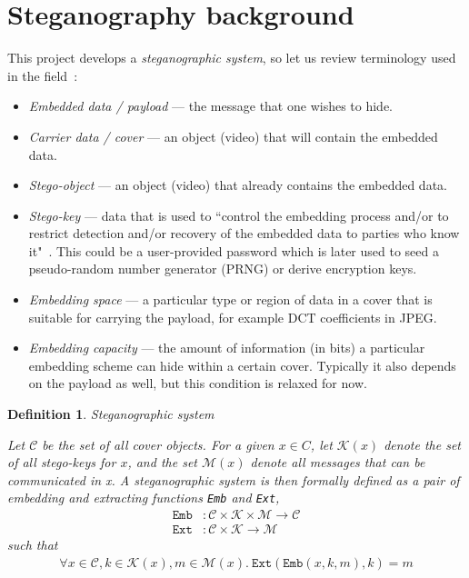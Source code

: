 \documentclass[12pt,british,twoside,notitlepage,usenames,dvipsnames,hypens,final]{report}
\newtheorem{definition}{Definition}
\numberwithin{equation}{section}
\numberwithin{figure}{section}
\begin{document}
\section{Steganography background}

This project develops a \emph{steganographic system}, so let us review terminology used in the field~\cite{infohiding-survey, bateman}:
\begin{itemize}
\item \emph{Embedded data / payload} --- the message that one wishes to hide.
\item \emph{Carrier data / cover} --- an object (video) that will contain the embedded data.
\item \emph{Stego-object } --- an object (video) that already contains the embedded data.
\item \emph{Stego-key} ---  data that is used to ``control the embedding process and/or to restrict detection and/or recovery of the embedded data to parties who know it"~\cite{infohiding-survey}. This could be a user-provided password which is later used to seed a pseudo-random number generator (PRNG) or derive encryption keys. 
\item \emph{Embedding space} --- a particular type or region of data in a cover that is suitable for carrying the payload, for example DCT coefficients in JPEG.
\item \emph{Embedding capacity} --- the amount of information (in bits) a particular embedding scheme can hide within a certain cover. Typically it also depends on the payload as well, but this condition is relaxed for now.
\end{itemize}

\begin{definition}{Steganographic system~\cite[p.~53]{fridrich}}

Let $\mathcal{C}$ be the set of all cover objects. For a given $x \in C$, let $\mathcal{K}(x)$ denote the set of all stego-keys for $x$, and the set $\mathcal{M}(x)$ denote all messages that can be communicated in x. A steganographic system is then formally defined as a pair of embedding and extracting functions \texttt{Emb} and \texttt{Ext},
\begin{align*}
\texttt{Emb} &: \mathcal{C} \times \mathcal{K} \times \mathcal{M} \rightarrow \mathcal{C} \\
\texttt{Ext} &: \mathcal{C} \times \mathcal{K} \rightarrow \mathcal{M}
\end{align*}
\vspace{-1mm}
such that
\vspace{-1mm}
\begin{align*}
\forall x \in \mathcal{C}, k \in \mathcal{K}(x), m \in \mathcal{M}(x) . ~ \texttt{Ext}(\texttt{Emb}(x, k, m), k) = m
\end{align*}

\end{definition}
\end{document}
